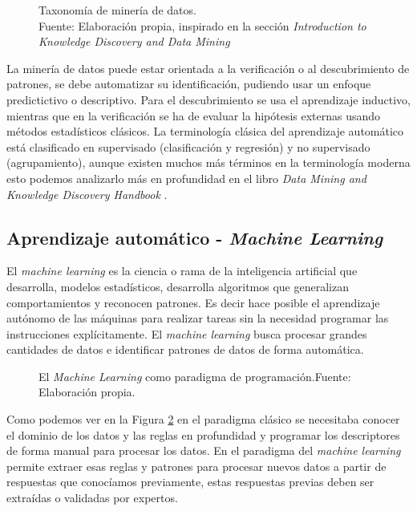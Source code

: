 \begin{figure}[H]
    \centering
    \centerline{}
    \caption{Taxonomía de minería de datos.\\Fuente: Elaboración propia, inspirado en la sección \textit{Introduction to Knowledge Discovery and Data Mining} \cite{maimon2005data}}
    \label{fig:data-mining-taxonomy}
\end{figure}

La minería de datos puede estar orientada a la verificación o al descubrimiento de patrones, se debe automatizar su identificación, pudiendo usar un enfoque predictictivo o descriptivo. Para el descubrimiento se usa el aprendizaje inductivo, mientras que en la verificación se ha de evaluar la hipótesis externas usando métodos estadísticos clásicos. La terminología clásica del aprendizaje automático está clasificado en supervisado (clasificación y regresión) y no supervisado (agrupamiento), aunque existen muchos más términos en la terminología moderna esto podemos analizarlo más en profundidad en el libro \textit{Data Mining and Knowledge Discovery Handbook} \cite{maimon2005data}.


\subsection{Aprendizaje automático - \textit{Machine Learning}}

El \textit{machine learning} es la ciencia o rama de la inteligencia artificial que desarrolla, modelos estadísticos, desarrolla algoritmos que generalizan comportamientos y reconocen patrones. Es decir hace posible el aprendizaje autónomo de las máquinas para realizar tareas sin la necesidad programar las instrucciones explícitamente. El \textit{machine learning} busca procesar grandes cantidades de datos e identificar patrones de datos de forma automática.

\begin{figure}[H]
    \centering
    \centerline{}
    \caption{El \textit{Machine Learning} como paradigma de programación.\newline{}Fuente: Elaboración propia.}
    \label{fig:machine-learning-rules}
\end{figure}

Como podemos ver en la Figura \ref{fig:machine-learning-rules} en el paradigma clásico se necesitaba conocer el dominio de los datos y las reglas en profundidad y programar los descriptores de forma manual para procesar los datos. En el paradigma del \textit{machine learning} permite extraer esas reglas y patrones para procesar nuevos datos a partir de respuestas que conocíamos previamente, estas respuestas previas deben ser extraídas o validadas por expertos.

